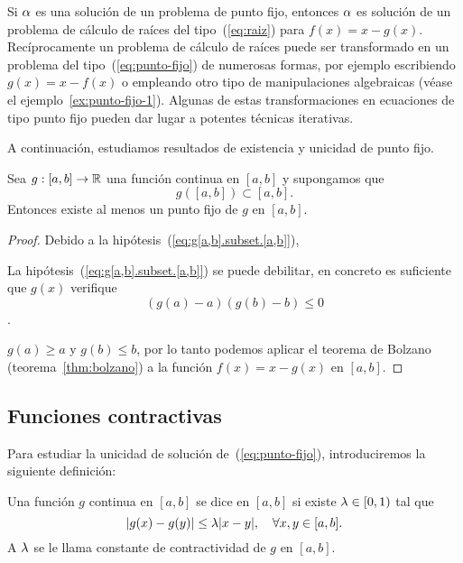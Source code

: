 Si $\alpha$ es una solución de un problema de punto fijo, entonces
$\alpha$ es solución de un problema de cálculo de raíces del
tipo~(\ref{eq:raiz}) para $f(x)=x-g(x)$. Recíprocamente un problema de
cálculo de raíces puede ser transformado en un problema del
tipo~(\ref{eq:punto-fijo}) de numerosas formas, por ejemplo
escribiendo $g(x)=x-f(x)$ o empleando otro tipo de manipulaciones
algebraicas (véase el ejemplo~\ref{ex:punto-fijo-1}). Algunas de estas
transformaciones en ecuaciones de tipo punto fijo pueden dar lugar a
potentes técnicas iterativas.

A continuación, estudiamos resultados de existencia y unicidad de
punto fijo.

\begin{proposition}
  \label{pro:existencia-punto-fijo}
  Sea $g:[a,b]\to\operatorname{{\mathbb R}}$ una función continua en $[a,b]$ y supongamos
  que
  \begin{equation}
    g([a,b])\subset [a,b].
  \label{eq:g[a,b].subset.[a,b]}  
\end{equation}
  Entonces existe al menos un punto fijo de $g$ en $[a,b]$.
\end{proposition}
\begin{proof}
  Debido a la hipótesis~(\ref{eq:g[a,b].subset.[a,b]}),
  \begin{extension}
    La hipótesis~(\ref{eq:g[a,b].subset.[a,b]}) se puede debilitar, en
    concreto es suficiente que $g(x)$ verifique
    $$(g(a)-a)(g(b)-b)\le 0$$.
  \end{extension}
  $g(a)\ge a$ y
  $g(b)\le b$, por lo tanto podemos aplicar el teorema de Bolzano
  (teorema~\ref{thm:bolzano}) a la función $f(x)=x-g(x)$ en $[a,b]$.
\end{proof}

\subsection*{Funciones contractivas}

Para estudiar la unicidad de solución de~(\ref{eq:punto-fijo}),
introduciremos la siguiente definición:

\begin{definition}
  Una función $g$ continua en $[a,b]$ se dice  en
  $[a,b]$ si existe $\lambda\in[0,1)$ tal que
  \begin{equation*}
    |g(x)-g(y)| \le \lambda |x-y|, \quad \forall x,y \in [a,b].
    \label{eq:contractividad}
  \end{equation*}
  A $\lambda$ se le llama constante de contractividad de $g$ en $[a,b]$.
  \label{def:funcion.contractiva}
\end{definition}

